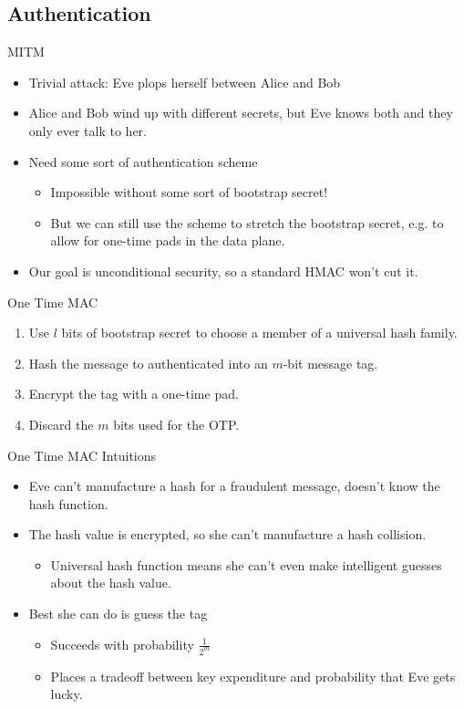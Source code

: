 \documentclass[pdf]{beamer}
\begin{document}
\subsection{Authentication}
\begin{frame}{MITM}
  \begin{itemize}
  \item Trivial attack: Eve plops herself between Alice and Bob
  \item Alice and Bob wind up with different secrets, but Eve knows
    both and they only ever talk to her.
  \item Need some sort of authentication scheme
    \begin{itemize}
    \item Impossible without some sort of bootstrap secret!
    \item But we can still use the scheme to stretch the bootstrap secret,
      e.g. to allow for one-time pads in the data plane.
    \end{itemize}
  \item Our goal is unconditional security, so a standard HMAC won't cut it.
  \end{itemize}
\end{frame}
\begin{frame}{One Time MAC}
  \begin{enumerate}
  \item Use $l$ bits of bootstrap secret to choose a member of a universal hash
    family.
  \item Hash the message to authenticated into an $m$-bit message tag.
  \item Encrypt the tag with a one-time pad.
  \item Discard the $m$ bits used for the OTP.
  \end{enumerate}
\end{frame}
\begin{frame}{One Time MAC Intuitions}
  \begin{itemize}
  \item Eve can't manufacture a hash for a fraudulent message, doesn't know
    the hash function.
  \item The hash value is encrypted, so she can't manufacture a hash collision.
    \begin{itemize}
    \item Universal hash function means she can't even make intelligent guesses
      about the hash value.
    \end{itemize}
  \item Best she can do is guess the tag
    \begin{itemize}
    \item Succeeds with probability $\frac{1}{2^m}$
    \item Places a tradeoff between key expenditure and probability that Eve
      gets lucky.
    \end{itemize}
  \end{itemize}
\end{frame}
\end{document}
